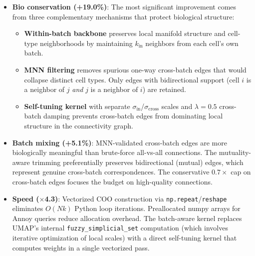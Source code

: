 \documentclass[8pt]{article}
\begin{document}
\begin{tcolorbox}[
    title={\textbf{bbknn\_optimized}: Comprehensive improvement via MNN selection + batch-aware kernel + mutual trimming},
    colback=lightgreen!10, colframe=added!60, fonttitle=\small\bfseries,
    boxrule=0.5pt, arc=2pt, left=6pt, right=6pt, top=3pt, bottom=3pt
]
\small
\begin{itemize}[leftmargin=1em, itemsep=3pt]
    \item \textbf{Bio conservation (+19.0\%)}: The most significant improvement comes from three complementary mechanisms that protect biological structure:
    \begin{itemize}[leftmargin=1em, itemsep=1pt]
        \item \textbf{Within-batch backbone} preserves local manifold structure and cell-type neighborhoods by maintaining $k_\text{in}$ neighbors from each cell's own batch.
        \item \textbf{MNN filtering} removes spurious one-way cross-batch edges that would collapse distinct cell types. Only edges with bidirectional support (cell $i$ is a neighbor of $j$ \emph{and} $j$ is a neighbor of $i$) are retained.
        \item \textbf{Self-tuning kernel} with separate $\sigma_\text{in}$/$\sigma_\text{cross}$ scales and $\lambda{=}0.5$ cross-batch damping prevents cross-batch edges from dominating local structure in the connectivity graph.
    \end{itemize}

    \item \textbf{Batch mixing (+5.1\%)}: MNN-validated cross-batch edges are more biologically meaningful than brute-force all-vs-all connections. The mutuality-aware trimming preferentially preserves bidirectional (mutual) edges, which represent genuine cross-batch correspondences. The conservative $0.7\times$ cap on cross-batch edges focuses the budget on high-quality connections.

    \item \textbf{Speed ($\times$4.3)}: Vectorized COO construction via \texttt{np.repeat}/\texttt{reshape} eliminates $O(Nk)$ Python loop iterations. Preallocated numpy arrays for Annoy queries reduce allocation overhead. The batch-aware kernel replaces UMAP's internal \texttt{fuzzy\_simplicial\_set} computation (which involves iterative optimization of local scales) with a direct self-tuning kernel that computes weights in a single vectorized pass.
\end{itemize}
\end{tcolorbox}
\end{document}
